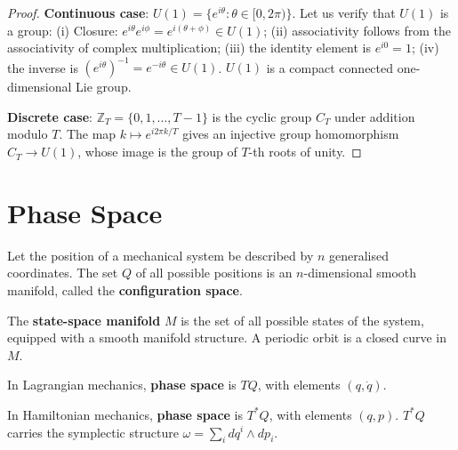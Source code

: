 \begin{proof}
\textbf{Continuous case}: $U(1) = \{e^{i\theta} : \theta \in [0, 2\pi)\}$. Let us verify that $U(1)$ is a group: (i) Closure: $e^{i\theta}e^{i\phi} = e^{i(\theta+\phi)} \in U(1)$; (ii) associativity follows from the associativity of complex multiplication; (iii) the identity element is $e^{i0} = 1$; (iv) the inverse is $(e^{i\theta})^{-1} = e^{-i\theta} \in U(1)$. $U(1)$ is a compact connected one-dimensional Lie group.

\textbf{Discrete case}: $\mathbb{Z}_T = \{0, 1, \dots, T-1\}$ is the cyclic group $C_T$ under addition modulo $T$. The map $k \mapsto e^{i2\pi k/T}$ gives an injective group homomorphism $C_T \to U(1)$, whose image is the group of $T$-th roots of unity.
\end{proof}

\section{Phase Space}

\begin{definition}\label{def:configuration_space}
Let the position of a mechanical system be described by $n$ generalised coordinates. The set $Q$ of all possible positions is an $n$-dimensional smooth manifold, called the \textbf{configuration space}.
\end{definition}

\begin{definition}\label{def:state_space_manifold}
The \textbf{state-space manifold} $M$ is the set of all possible states of the system, equipped with a smooth manifold structure. A periodic orbit is a closed curve in $M$.
\end{definition}

\begin{definition}\label{def:phase_space_tangent}
In Lagrangian mechanics, \textbf{phase space} is $TQ$, with elements $(q, \dot{q})$.
\end{definition}

\begin{definition}\label{def:phase_space_cotangent}
In Hamiltonian mechanics, \textbf{phase space} is $T^*Q$, with elements $(q, p)$. $T^*Q$ carries the symplectic structure $\omega = \sum_i dq^i \wedge dp_i$.
\end{definition}

